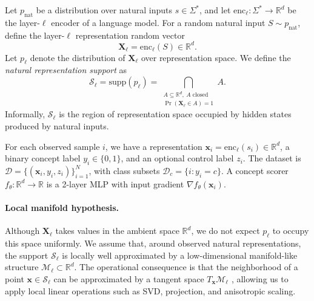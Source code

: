 Let $p_{\mathrm{nat}}$ be a distribution over natural inputs $s \in \Sigma^*$, and let
$\mathrm{enc}_\ell : \Sigma^* \to \mathbb{R}^d$ be the layer-$\ell$ encoder of a language model.
For a random natural input $S \sim p_{\mathrm{nat}}$, define the layer-$\ell$ representation random vector
\begin{equation}
    \mathbf{X}_\ell = \mathrm{enc}_\ell(S) \in \mathbb{R}^d .
\end{equation}
Let $p_\ell$ denote the distribution of $\mathbf{X}_\ell$ over representation space. We define the
\emph{natural representation support} as
\begin{equation}
\label{eq:natural_rep_support}
    \mathcal{S}_\ell
    =
    \mathrm{supp}(p_\ell)
    =
    \bigcap_{\substack{
    A \subseteq \mathbb{R}^d,\ A \text{ closed} \\
    \Pr(\mathbf{X}_\ell \in A)=1
    }} A .
\end{equation}
Informally, $\mathcal{S}_\ell$ is the region of representation space occupied by hidden states
produced by natural inputs.

For each observed sample $i$, we have a representation
$\mathbf{x}_i = \mathrm{enc}_\ell(s_i) \in \mathbb{R}^d$, a binary concept label
$y_i \in \{0,1\}$, and an optional control label $z_i$. The dataset is
$\mathcal{D} = \{(\mathbf{x}_i, y_i, z_i)\}_{i=1}^N$, with class subsets
$\mathcal{D}_c = \{i : y_i = c\}$. A concept scorer
$f_\theta : \mathbb{R}^d \to \mathbb{R}$ is a 2-layer MLP with input gradient
$\nabla f_\theta(\mathbf{x}_i)$.

\paragraph{Local manifold hypothesis.}
Although $\mathbf{X}_\ell$ takes values in the ambient space $\mathbb{R}^d$, we do not expect
$p_\ell$ to occupy this space uniformly. We assume that, around observed natural representations,
the support $\mathcal{S}_\ell$ is locally well approximated by a low-dimensional manifold-like
structure $\mathcal{M}_\ell \subset \mathbb{R}^d$. The operational consequence is that the
neighborhood of a point $\mathbf{x} \in \mathcal{S}_\ell$ can be approximated by a tangent space
$T_{\mathbf{x}}\mathcal{M}_\ell$ \citep{tu-2011-manifolds}, allowing us to apply local linear
operations such as SVD, projection, and anisotropic scaling.

